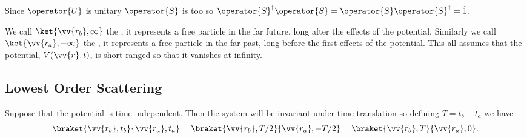 \documentclass[fleqn]{NotesClass}
\newcommand*{\idop}{\hat{1}}
\newcommand*{\hermit}{\dagger}
\begin{document}
    Since \(\operator{U}\) is unitary \(\operator{S}\) is too so \(\operator{S}^\hermit \operator{S} = \operator{S}\operator{S}^\hermit = \idop\).
    
    We call \(\ket{\vv{r_b}, \infty}\) the , it represents a free particle in the far future, long after the effects of the potential.
    Similarly we call \(\ket{\vv{r_a}, -\infty}\) the , it represents a free particle in the far past, long before the first effects of the potential.
    This all assumes that the potential, \(V(\vv{r}, t)\), is short ranged so that it vanishes at infinity.
    
    \subsection{Lowest Order Scattering}
    Suppose that the potential is time independent.
    Then the system will be invariant under time translation so defining \(T = t_b - t_a\) we have
    \begin{equation}
        \braket{\vv{r_b}, t_b}{\vv{r_a}, t_a} = \braket{\vv{r_b}, T/2}{\vv{r_a}, -T/2} = \braket{\vv{r_b}, T}{\vv{r_a}, 0}.
    \end{equation}
    
\end{document}
